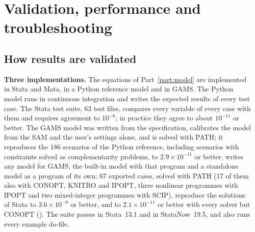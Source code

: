 \chapter{Validation, performance and troubleshooting}\label{chap:validation}

\section{How results are validated}

\textbf{Three implementations.} The equations of Part~\ref{part:model} are
implemented in Stata and Mata, in a Python reference model and in GAMS. The
Python model runs in continuous integration and writes the expected results of
every test case. The Stata test suite, 63 test files, compares every variable
of every case with them and requires agreement to $10^{-6}$; in practice they
agree to about $10^{-11}$ or better. The GAMS model was written from the
specification, calibrates the model from the SAM and the user's settings alone,
and is solved with PATH; it reproduces the 186 scenarios of the Python
reference, including scenarios with constraints solved as complementarity
problems, to $2.9 \times 10^{-11}$ or better.  writes any model
for GAMS, the built-in model with that program and a standalone model as a
program of its own: 67 exported cases, solved with PATH (17 of them also with
CONOPT, KNITRO and IPOPT, three nonlinear programmes with IPOPT and two
mixed-integer programmes with SCIP), reproduce the solutions of Stata to
$3.6 \times 10^{-9}$ or better, and to $2.1 \times 10^{-11}$ or better with
every solver but CONOPT (). The suite passes in
Stata~13.1 and in StataNow~19.5, and also runs every example do-file.

